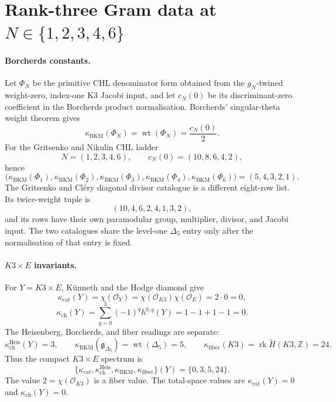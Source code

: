 
\providecommand{\kBKM}{\kappa_{\mathrm{BKM}}}
\providecommand{\kch}{\kappa_{\mathrm{ch}}}
\providecommand{\kcat}{\kappa_{\mathrm{cat}}}
\providecommand{\kfib}{\kappa_{\mathrm{fiber}}}
\providecommand{\fg}{\mathfrak{g}}
\providecommand{\Z}{\mathbb{Z}}
\providecommand{\Q}{\mathbb{Q}}
\providecommand{\DeltaFive}{\Delta_5}

\section*{Rank-three Gram data at $N \in \{1,2,3,4,6\}$}
\label{sec:cartan-gram-gN}

\paragraph{Borcherds constants.}
Let $\Phi_N$ be the primitive CHL denominator form obtained from the
$g_N$-twined weight-zero, index-one K3 Jacobi input, and let $c_N(0)$
be its discriminant-zero coefficient in the Borcherds product
normalisation. Borcherds' singular-theta weight theorem gives
\[
  \kBKM(\Phi_N)=\operatorname{wt}(\Phi_N)=\frac{c_N(0)}{2}.
\]
For the Gritsenko and Nikulin CHL ladder
\[
  N=(1,2,3,4,6),
  \qquad
  c_N(0)=(10,8,6,4,2),
\]
hence
\[
  \bigl(\kBKM(\Phi_1),\kBKM(\Phi_2),\kBKM(\Phi_3),
  \kBKM(\Phi_4),\kBKM(\Phi_6)\bigr)=(5,4,3,2,1).
\]
The Gritsenko and Cl\'ery diagonal divisor catalogue is a different
eight-row list. Its twice-weight tuple is
\[
  (10,4,6,2,4,1,3,2),
\]
and its rows have their own paramodular group, multiplier, divisor, and
Jacobi input. The two catalogues share the level-one
$\DeltaFive$ entry only after the normalisation of that entry is fixed.

\paragraph{$K3 \times E$ invariants.}
For $Y=K3\times E$, K\"unneth and the Hodge diamond give
\[
  \kcat(Y)=\chi(\mathcal O_Y)
  =\chi(\mathcal O_{K3})\chi(\mathcal O_E)=2\cdot0=0,
\]
\[
  \kch(Y)=\sum_{q=0}^{3}(-1)^q h^{0,q}(Y)
  =1-1+1-1=0.
\]
The Heisenberg, Borcherds, and fiber readings are separate:
\[
  \kappa_{\mathrm{ch}}^{\mathrm{Heis}}(Y)=3,\qquad
  \kBKM(\fg_{\DeltaFive})=\operatorname{wt}(\DeltaFive)=5,\qquad
  \kfib(K3)=\operatorname{rk}\widetilde H(K3,\Z)=24.
\]
Thus the compact $K3\times E$ spectrum is
\[
  \{\kcat,\kappa_{\mathrm{ch}}^{\mathrm{Heis}},\kBKM,\kfib\}(Y)
  =\{0,3,5,24\}.
\]
The value $2=\chi(\mathcal O_{K3})$ is a fiber value. The total-space
values are $\kcat(Y)=0$ and $\kch(Y)=0$.

